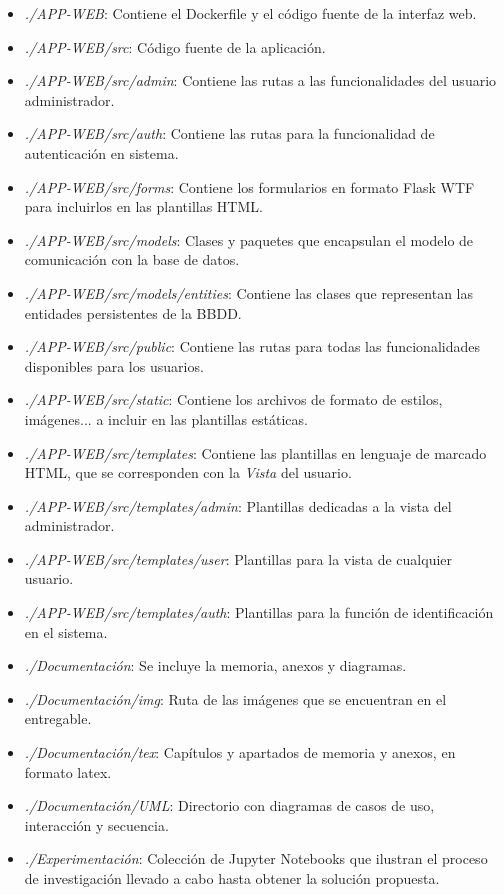 \begin{itemize}
    \item \textit{./APP-WEB}: Contiene el Dockerfile y el código fuente de la interfaz web.
    \item \textit{./APP-WEB/src}: Código fuente de la aplicación.
    \item \textit{./APP-WEB/src/admin}: Contiene las rutas a las funcionalidades del usuario administrador.
    \item \textit{./APP-WEB/src/auth}: Contiene las rutas para la funcionalidad de autenticación en sistema.
    \item \textit{./APP-WEB/src/forms}: Contiene los formularios en formato Flask WTF para incluirlos en las plantillas HTML.
    \item \textit{./APP-WEB/src/models}: Clases y paquetes que encapsulan el modelo de comunicación con la base de datos.
    \item \textit{./APP-WEB/src/models/entities}: Contiene las clases que representan las entidades persistentes de la BBDD.
    \item \textit{./APP-WEB/src/public}: Contiene las rutas para todas las funcionalidades disponibles para los usuarios.
    \item \textit{./APP-WEB/src/static}: Contiene los archivos de formato de estilos, imágenes... a incluir en las plantillas estáticas.
    \item \textit{./APP-WEB/src/templates}: Contiene las plantillas en lenguaje de marcado HTML, que se corresponden con la \textit{Vista} del usuario.
    \item \textit{./APP-WEB/src/templates/admin}: Plantillas dedicadas a la vista del administrador.
    \item \textit{./APP-WEB/src/templates/user}: Plantillas para la vista de cualquier usuario.
    \item \textit{./APP-WEB/src/templates/auth}: Plantillas para la función de identificación en el sistema.
    \item \textit{./Documentación}: Se incluye la memoria, anexos y diagramas.
    \item \textit{./Documentación/img}: Ruta de las imágenes que se encuentran en el entregable.
    \item \textit{./Documentación/tex}: Capítulos y apartados de memoria y anexos, en formato latex.
    \item \textit{./Documentación/UML}: Directorio con diagramas de casos de uso, interacción y secuencia.
    \item \textit{./Experimentación}: Colección de Jupyter Notebooks que ilustran el proceso de investigación llevado a cabo hasta obtener la solución propuesta.

\end{itemize}
